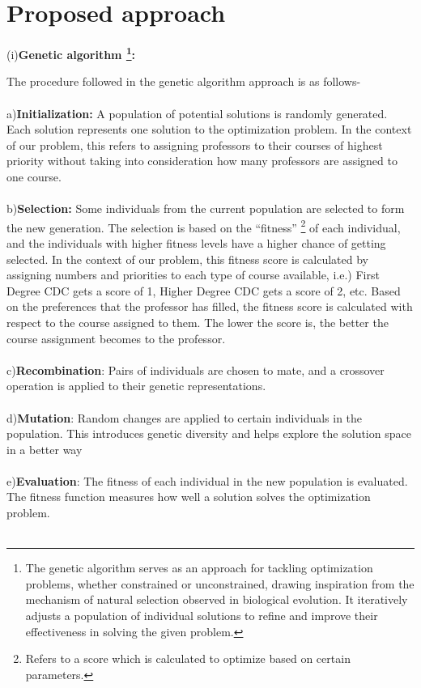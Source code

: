 \documentclass[a4paper,12pt]{article}
\begin{document}
\section {Proposed approach}
(i)\textbf{Genetic algorithm
\footnote{ The genetic algorithm serves as an approach for tackling optimization problems, whether constrained or unconstrained, drawing inspiration from the mechanism of natural selection observed in biological evolution. It iteratively adjusts a population of individual solutions to refine and improve their effectiveness in solving the given problem.}:}

 The procedure followed in the genetic algorithm approach is as follows-\\ \\
a)\textbf{Initialization:} A population of potential solutions is randomly generated. Each solution represents one solution to the optimization problem. In the context of our problem, this refers to assigning professors to their courses of highest priority without taking into consideration how many professors are assigned to one course.\\ \\
b)\textbf{Selection:} Some individuals from the current population are selected to form the new generation. The selection is based on the “fitness” \footnote{Refers to a score which is calculated to optimize based on certain parameters.} of each individual, and the individuals with higher fitness levels have a higher chance of getting selected. In the context of our problem, this fitness score is calculated by assigning numbers and priorities to each type of course available, i.e.) First Degree CDC gets a score of 1, Higher Degree CDC gets a score of 2, etc. Based on the preferences that the professor has filled, the fitness score is calculated with respect to the course assigned to them. The lower the score is, the better the course assignment becomes to the professor.\\ \\
c)\textbf{Recombination}: Pairs of individuals are chosen to mate, and a crossover operation is applied to their genetic representations. \\ \\
d)\textbf{Mutation}: Random changes are applied to certain individuals in the population. This introduces genetic diversity and helps explore the solution space in a better way \\ \\
e)\textbf{Evaluation}: The fitness of each individual in the new population is evaluated. The fitness function measures how well a solution solves the optimization problem. \\ \\
\end{document}
